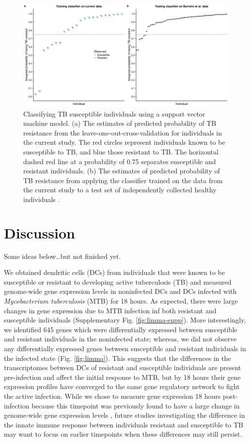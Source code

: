 \documentclass[fleqn,10pt]{wlscirep}
\begin{document}
\begin{figure}[ht]
\centering
\includegraphics[width=\linewidth]{../figure/classifier-svm.pdf}
\caption{
Classifying TB susceptible individuals using a support vector machine
model. (a) The estimates of predicted probability of TB resistance
from the leave-one-out-cross-validation for individuals in the current
study. The red circles represent individuals known to be susceptible
to TB, and blue those resistant to TB. The horizontal dashed red line
at a probability of 0.75 separates susceptible and resistant
individuals. (b) The estimates of predicted probability of TB
resistance from applying the classifier trained on the data from the
current study to a test set of independently collected healthy
individuals \cite{Barreiro2012}.
}
\label{fig:classifier}
\end{figure}

\section*{Discussion}

Some ideas below…but not finished yet.

We obtained dendritic cells (DCs) from individuals that were known to
be susceptible or resistant to developing active tuberculosis (TB) and
measured genome-wide gene expression levels in noninfected DCs and DCs
infected with \emph{Mycobacterium tuberculosis} (MTB) for 18 hours. As
expected, there were large changes in gene expression due to MTB
infection inf both resistant and susceptible individuals
(Supplementary Fig. \ref{fig:limma-supp}). More interestingly, we
identified 645 genes which were differentially expressed between
susceptible and resistant individuals in the noninfected state;
whereas, we did not observe any differentially expressed genes between
susceptible and resistant individuals in the infected state (Fig.
\ref{fig:limma}). This suggests that the differences in the
transcriptomes between DCs of resistant and susceptible individuals
are present pre-infection and affect the initial response to MTB, but
by 18 hours their gene expression profiles have converged to the same
gene regulatory network to fight the active infection. While we chose
to measure gene expression 18 hours post-infection because this
timepoint was previously found to have a large change in genome-wide
gene expression levels \cite{Tailleux2008}, future studies
investigating the difference in the innate immune response between
individuals resistant and susceptible to TB may want to focus on
earlier timepoints when these differences may still persist.
\end{document}
